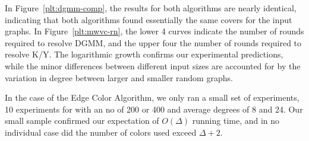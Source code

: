 \documentclass[conference, 10pt, letter]{IEEEtran}
\begin{document}
In Figure~\ref{plt:dgmm-comp}, the results for both algorithms are nearly identical, indicating that both algorithms found essentially the same covers for the input graphs. In Figure~\ref{plt:mwvc-rn}, the lower 4 curves indicate the number of rounds required to resolve DGMM, and the upper four the number of rounds required to resolve K/Y. The logarithmic growth confirms our experimental predictions, while the minor differences between different input sizes are accounted for by the variation in degree between larger and smaller random graphs.

In the case of the Edge Color Algorithm, we only ran a small set of experiments, 10 experiments for with an no of 200 or 400 and average degrees of 8 and 24. Our small sample confirmed our expectation of $O(\Delta)$ running time, and in no individual case did the number of colors used exceed $\Delta + 2$.


\end{document}
